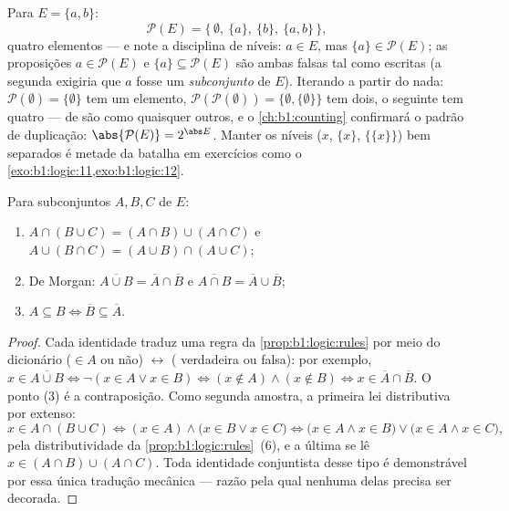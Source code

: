 \begin{example}\label{ex:b1:logic:powerset}
Para $E = \{a, b\}$:
\[
\mathcal P(E) = \bigl\{\, \emptyset,\ \{a\},\ \{b\},\ \{a, b\}
\,\bigr\},
\]
quatro elementos --- e note a disciplina de níveis: $a \in E$, mas
$\{a\} \in \mathcal P(E)$; as proposições $a \in \mathcal P(E)$
e $\{a\} \subseteq \mathcal P(E)$ são ambas falsas tal como escritas
(a segunda exigiria que $a$ fosse um \emph{subconjunto} de $E$).
Iterando a partir do nada: $\mathcal P(\emptyset) = \{\emptyset\}$
tem um elemento, $\mathcal P(\mathcal P(\emptyset)) = \{\emptyset,
\{\emptyset\}\}$ tem dois, o seguinte tem quatro ---  de  são
 como quaisquer outros, e o \cref{ch:b1:counting} confirmará o padrão de
duplicação: $\abs{\mathcal P(E)} = 2^{\abs E}$. Manter os níveis
($x$, $\{x\}$, $\{\{x\}\}$) bem separados é metade da batalha em
exercícios como o \cref{exo:b1:logic:11,exo:b1:logic:12}.
\end{example}

\begin{proposition}\label{prop:b1:logic:setalgebra}
Para subconjuntos $A, B, C$ de $E$:
\begin{enumerate}
  \item $A \cap (B \cup C) = (A \cap B) \cup (A \cap C)$ e
        $A \cup (B \cap C) = (A \cup B) \cap (A \cup C)$;
  \item De Morgan: $\overline{A \cup B} = \overline{A} \cap
        \overline{B}$ e $\overline{A \cap B} = \overline{A} \cup
        \overline{B}$;
  \item $A \subseteq B \iff \overline{B} \subseteq \overline{A}$.
\end{enumerate}
\end{proposition}

\begin{proof}
Cada identidade traduz uma regra da \cref{prop:b1:logic:rules} por meio do
dicionário ($\in A$ ou não) $\leftrightarrow$ ( verdadeira ou
falsa): por exemplo, $x \in \overline{A \cup B} \iff \lnot(x \in A \lor x \in
B) \iff (x \notin A) \land (x \notin B) \iff x \in \overline{A} \cap
\overline{B}$. O ponto (3) é a contraposição. Como segunda amostra, a
primeira lei distributiva por extenso:
\[
x \in A \cap (B \cup C)
\iff (x \in A) \land \bigl(x \in B \lor x \in C\bigr)
\iff \bigl(x \in A \land x \in B\bigr) \lor
\bigl(x \in A \land x \in C\bigr),
\]
pela distributividade da \cref{prop:b1:logic:rules}~(6), e a
última  se lê $x \in (A \cap B) \cup (A \cap C)$. Toda identidade
conjuntista desse tipo é demonstrável por essa única tradução
mecânica --- razão pela qual nenhuma delas precisa ser decorada.
\end{proof}

